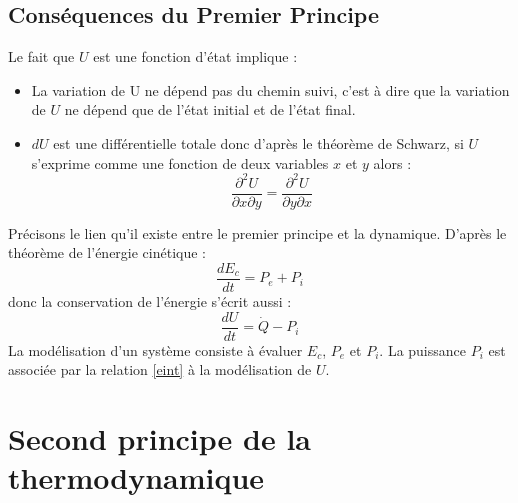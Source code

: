 \documentclass[12pt]{book}
\begin{document}
\subsection{Cons\'equences du Premier Principe}
Le fait que $U$ est une fonction d'\'etat implique :
\begin{itemize}
\item La variation de U ne d\'epend pas du chemin suivi, c'est \`a dire
que la variation de $U$ ne d\'epend que de l'\'etat initial et de l'\'etat
final. 
\item $dU$ est une diff\'erentielle totale donc d'apr\`es le
th\'eor\`eme de 
Schwarz, si $U$ s'exprime comme une fonction de deux variables $x$ et
$y$ alors :
\begin{equation}
\frac{\partial^2 U}{\partial x\partial y}=\frac{\partial^2 U}{\partial
y\partial x} 
\end{equation}
\end{itemize}
Pr\'ecisons le lien qu'il existe entre le premier principe et la
dynamique. D'apr\`es le th\'eor\`eme de l'\'energie cin\'etique :
\begin{equation}
\frac{dE_c}{dt}=P_e+P_i
\end{equation}
donc la conservation de l'\'energie s'\'ecrit aussi :
\begin{equation}\label{eint}
\frac{dU}{dt}=\dot Q-P_i
\end{equation}
La mod\'elisation d'un syst\`eme consiste \`a \'evaluer $E_c$,
$P_e$ et $P_i$. La puissance $P_i$ est associ\'ee par la relation
\ref{eint} \`a la mod\'elisation de $U$.
\section{Second principe de la thermodynamique}
\end{document}
